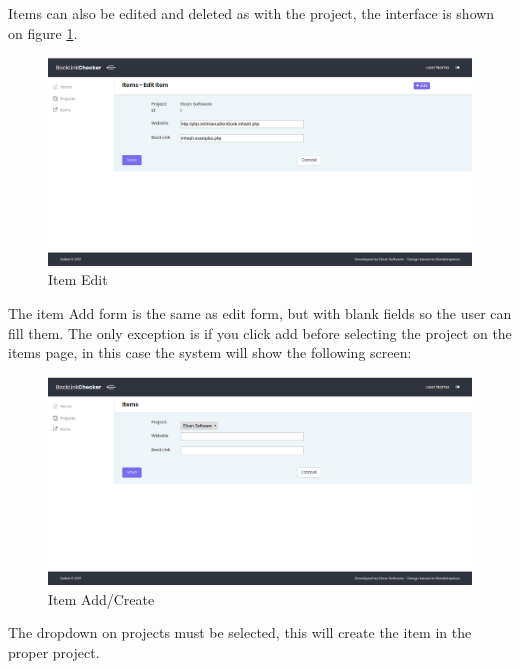 Items can also be edited and deleted as with the project, the interface is shown on figure \ref{img:edititem}.
\begin{figure}[H]
	\caption{Item Edit}
	\label{img:edititem}
	\includegraphics[width=\textwidth]{images/items_edit}
\end{figure}

The item Add form is the same as edit form, but with blank fields so the user can fill them. The only exception is if you click add before selecting the project on the items page, in this case the system will show the following screen:
\begin{figure}[H]
	\caption{Item Add/Create}
	\label{img:itmadd}
	\includegraphics[width=\textwidth]{images/items_add}
\end{figure}
The dropdown on projects must be selected, this will create the item in the proper project.

